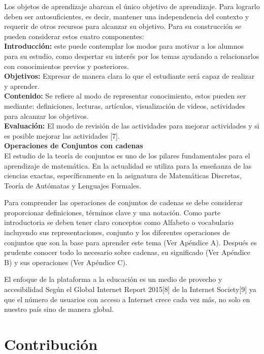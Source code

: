 \documentclass{llncs}
\begin{document}
Los objetos de aprendizaje abarcan el único objetivo de aprendizaje. Para lograrlo deben ser autosuficientes, es decir, mantener una independencia del contexto y requerir de otros recursos para alcanzar su objetivo.
Para su construcción se pueden considerar estos cuatro componentes:\\
\textbf{Introducción:} este puede contemplar los modos para motivar a los alumnos para su estudio, como despertar su interés por los temas ayudando a relacionarlos con conocimientos previos y posteriores.\\
\textbf{Objetivos:} Expresar de manera clara lo que el estudiante será capaz de realizar y aprender.\\
\textbf{Contenido:} Se refiere al modo de representar conocimiento, estos pueden ser mediante: definiciones, lecturas, artículos, visualización de videos, actividades para alcanzar los objetivos.\\
\textbf{Evaluación:} El modo de revisión de las actividades para mejorar actividades y si es posible mejorar las actividades [7].\\

\textbf{Operaciones de Conjuntos con cadenas}\\
El estudio de la teoría de conjuntos es uno de los pilares fundamentales para el aprendizaje de matemática. En la actualidad se utiliza para la enseñanza de las ciencias exactas, específicamente en la asignatura de Matemáticas Discretas, Teoría de Autómatas y Lenguajes Formales.

Para comprender las operaciones de conjuntos de cadenas se debe considerar proporcionar definiciones, términos clave y una notación. Como parte introductoria se deben tener claro conceptos como Alfabeto o vocabulario incluyendo sus representaciones, conjunto y los diferentes operaciones de conjuntos que son la base para aprender este tema (Ver Apéndice A). Después es prudente conocer todo lo necesario sobre cadenas, su significado (Ver Apéndice B) y sus operaciones (Ver Apéndice C).

El enfoque de la plataforma a la educación es un medio de provecho y accesibilidad Según el Global Internet Report 2015[8] de la Internet Society[9] ya que el número de usuarios con acceso a Internet crece cada vez más, no solo en nuestro país sino de manera global.


%

%
\section{Contribución}
%
\end{document}
